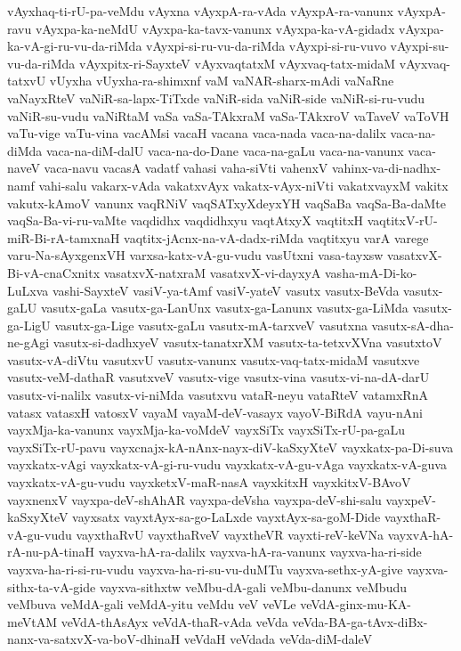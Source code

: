 {vAyxhaq-ti-rU-pa-veMdu
vAyxna
vAyxpA-ra-vAda
vAyxpA-ra-vanunx
vAyxpA-ravu
vAyxpa-ka-neMdU
vAyxpa-ka-tavx-vanunx
vAyxpa-ka-vA-gidadx
vAyxpa-ka-vA-gi-ru-vu-da-riMda
vAyxpi-si-ru-vu-da-riMda
vAyxpi-si-ru-vuvo
vAyxpi-su-vu-da-riMda
vAyxpitx-ri-SayxteV
vAyxvaqtatxM
vAyxvaq-tatx-midaM
vAyxvaq-tatxvU
vUyxha
vUyxha-ra-shimxnf
vaM
vaNAR-sharx-mAdi
vaNaRne
vaNayxRteV
vaNiR-sa-lapx-TiTxde
vaNiR-sida
vaNiR-side
vaNiR-si-ru-vudu
vaNiR-su-vudu
vaNiRtaM
vaSa
vaSa-TAkxraM
vaSa-TAkxroV
vaTaveV
vaToVH
vaTu-vige
vaTu-vina
vacAMsi
vacaH
vacana
vaca-nada
vaca-na-dalilx
vaca-na-diMda
vaca-na-diM-dalU
vaca-na-do-Dane
vaca-na-gaLu
vaca-na-vanunx
vaca-naveV
vaca-navu
vacasA
vadatf
vahasi
vaha-siVti
vahenxV
vahinx-va-di-nadhx-namf
vahi-salu
vakarx-vAda
vakatxvAyx
vakatx-vAyx-niVti
vakatxvayxM
vakitx
vakutx-kAmoV
vanunx
vaqRNiV
vaqSATxyXdeyxYH
vaqSaBa
vaqSa-Ba-daMte
vaqSa-Ba-vi-ru-vaMte
vaqdidhx
vaqdidhxyu
vaqtAtxyX
vaqtitxH
vaqtitxV-rU-miR-Bi-rA-tamxnaH
vaqtitx-jAcnx-na-vA-dadx-riMda
vaqtitxyu
varA
varege
varu-Na-sAyxgenxVH
varxsa-katx-vA-gu-vudu
vasUtxni
vasa-tayxsw
vasatxvX-Bi-vA-cnaCxnitx
vasatxvX-natxraM
vasatxvX-vi-dayxyA
vasha-mA-Di-ko-LuLxva
vashi-SayxteV
vasiV-ya-tAmf
vasiV-yateV
vasutx
vasutx-BeVda
vasutx-gaLU
vasutx-gaLa
vasutx-ga-LanUnx
vasutx-ga-Lanunx
vasutx-ga-LiMda
vasutx-ga-LigU
vasutx-ga-Lige
vasutx-gaLu
vasutx-mA-tarxveV
vasutxna
vasutx-sA-dha-ne-gAgi
vasutx-si-dadhxyeV
vasutx-tanatxrXM
vasutx-ta-tetxvXVna
vasutxtoV
vasutx-vA-diVtu
vasutxvU
vasutx-vanunx
vasutx-vaq-tatx-midaM
vasutxve
vasutx-veM-dathaR
vasutxveV
vasutx-vige
vasutx-vina
vasutx-vi-na-dA-darU
vasutx-vi-nalilx
vasutx-vi-niMda
vasutxvu
vataR-neyu
vataRteV
vatamxRnA
vatasx
vatasxH
vatosxV
vayaM
vayaM-deV-vasayx
vayoV-BiRdA
vayu-nAni
vayxMja-ka-vanunx
vayxMja-ka-voMdeV
vayxSiTx
vayxSiTx-rU-pa-gaLu
vayxSiTx-rU-pavu
vayxcnajx-kA-nAnx-nayx-diV-kaSxyXteV
vayxkatx-pa-Di-suva
vayxkatx-vAgi
vayxkatx-vA-gi-ru-vudu
vayxkatx-vA-gu-vAga
vayxkatx-vA-guva
vayxkatx-vA-gu-vudu
vayxketxV-maR-nasA
vayxkitxH
vayxkitxV-BAvoV
vayxnenxV
vayxpa-deV-shAhAR
vayxpa-deVsha
vayxpa-deV-shi-salu
vayxpeV-kaSxyXteV
vayxsatx
vayxtAyx-sa-go-LaLxde
vayxtAyx-sa-goM-Dide
vayxthaR-vA-gu-vudu
vayxthaRvU
vayxthaRveV
vayxtheVR
vayxti-reV-keVNa
vayxvA-hA-rA-nu-pA-tinaH
vayxva-hA-ra-dalilx
vayxva-hA-ra-vanunx
vayxva-ha-ri-side
vayxva-ha-ri-si-ru-vudu
vayxva-ha-ri-su-vu-duMTu
vayxva-sethx-yA-give
vayxva-sithx-ta-vA-gide
vayxva-sithxtw
veMbu-dA-gali
veMbu-danunx
veMbudu
veMbuva
veMdA-gali
veMdA-yitu
veMdu
veV
veVLe
veVdA-ginx-mu-KA-meVtAM
veVdA-thAsAyx
veVdA-thaR-vAda
veVda
veVda-BA-ga-tAvx-diBx-nanx-va-satxvX-va-boV-dhinaH
veVdaH
veVdada
veVda-diM-daleV
}
